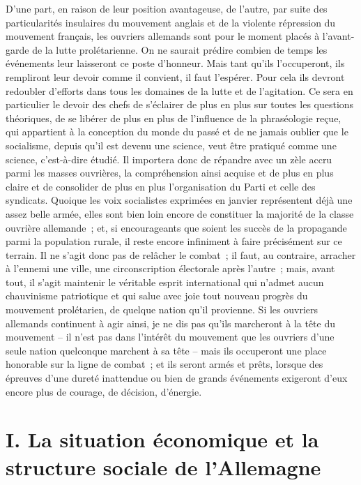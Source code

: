 \documentclass[french,twoside]{book} %
\newcommand\chapteropen{} %
\newcommand\chapterclose{} %
\begin{document}
D’une part, en raison de leur position avantageuse, de l’autre, par suite des particularités insulaires du mouvement anglais et de la violente répression du mouvement français, les ouvriers allemands sont pour le moment placés à l’avant-garde de la lutte prolétarienne. On ne saurait prédire combien de temps les événements leur laisseront ce poste d’honneur. Mais tant qu’ils l’occuperont, ils rempliront leur devoir comme il convient, il faut l’espérer. Pour cela ils devront redoubler d’efforts dans tous les domaines de la lutte et de l’agitation. Ce sera en particulier le devoir des chefs de s’éclairer de plus en plus sur toutes les questions théoriques, de se libérer de plus en plus de l’influence de la phraséologie reçue, qui appartient à la conception du monde du passé et de ne jamais oublier que le socialisme, depuis qu’il est devenu une science, veut être pratiqué comme une science, c’est-à-dire étudié. Il importera donc de répandre avec un zèle accru parmi les masses ouvrières, la compréhension ainsi acquise et de plus en plus claire et de consolider de plus en plus l’organisation du Parti et celle des syndicats. Quoique les voix socialistes exprimées en janvier représentent déjà une assez belle armée, elles sont bien loin encore de constituer la majorité de la classe ouvrière allemande ; et, si encourageants que soient les succès de la propagande parmi la population rurale, il reste encore infiniment à faire précisément sur ce terrain. Il ne s’agit donc pas de relâcher le combat ; il faut, au contraire, arracher à l’ennemi une ville, une circonscription électorale après l’autre ; mais, avant tout, il s’agit maintenir le véritable esprit international qui n’admet aucun chauvinisme patriotique et qui salue avec joie tout nouveau progrès du mouvement prolétarien, de quelque nation qu’il provienne. Si les ouvriers allemands continuent à agir ainsi, je ne dis pas qu’ils marcheront à la tête du mouvement – il n’est pas dans l’intérêt du mouvement que les ouvriers d’une seule nation quelconque marchent à sa tête – mais ils occuperont une place honorable sur la ligne de combat ; et ils seront armés et prêts, lorsque des épreuves d’une dureté inattendue ou bien de grands événements exigeront d’eux encore plus de courage, de décision, d’énergie.
\chapterclose


\chapteropen
\renewcommand{\leftmark}{I. La situation économique et la structure sociale de l’Allemagne}
\chapter[I. La situation économique et la structure sociale de l’Allemagne]{I. La situation économique et la structure sociale de l’Allemagne}
\end{document}
